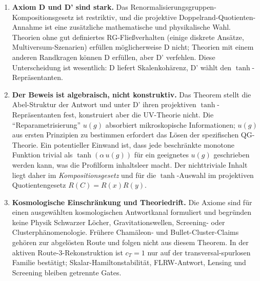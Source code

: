 \documentclass[aps,prd,twocolumn,superscriptaddress,nofootinbib]{revtex4-2}
\begin{document}
\begin{enumerate}
\item \textbf{Axiom D und D' sind stark.} Das Renormalisierungsgruppen-Kompositionsgesetz ist restriktiv, und die projektive Doppelrand-Quotienten-Annahme ist eine zusätzliche mathematische und physikalische Wahl. Theorien ohne gut definiertes RG-Fließverhalten (einige diskrete Ansätze, Multiversum-Szenarien) erfüllen möglicherweise D nicht; Theorien mit einem anderen Randkragen können D erfüllen, aber D' verfehlen. Diese Unterscheidung ist wesentlich: D liefert Skalenkohärenz, D' wählt den $\tanh$-Repräsentanten.

\item \textbf{Der Beweis ist algebraisch, nicht konstruktiv.} Das Theorem stellt die Abel-Struktur der Antwort und unter D' ihren projektiven $\tanh$-Repräsentanten fest, konstruiert aber die UV-Theorie nicht. Die ``Reparametrisierung'' $u(g)$ absorbiert mikroskopische Informationen; $u(g)$ aus ersten Prinzipien zu bestimmen erfordert das Lösen der spezifischen QG-Theorie. Ein potentieller Einwand ist, dass jede beschränkte monotone Funktion trivial als $\tanh(\alpha\,u(g))$ für ein geeignetes $u(g)$ geschrieben werden kann, was die Profilform inhaltsleer macht. Der nichttriviale Inhalt liegt daher im \textit{Kompositionsgesetz} und für die $\tanh$-Auswahl im projektiven Quotientengesetz $R(C)=R(x)R(y)$.

\item \textbf{Kosmologische Einschränkung und Theoriedrift.} Die Axiome sind für einen ausgewählten kosmologischen Antwortkanal formuliert und begründen keine Physik Schwarzer Löcher, Gravitationswellen, Screening- oder Clusterphänomenologie. Frühere Chamäleon- und Bullet-Cluster-Claims gehören zur abgelösten Route und folgen nicht aus diesem Theorem. In der aktiven Route-3-Rekonstruktion ist $c_T=1$ nur auf der transversal-spurlosen Familie bestätigt; Skalar-Hamiltonstabilität, FLRW-Antwort, Lensing und Screening bleiben getrennte Gates.


\end{enumerate}
\end{document}
